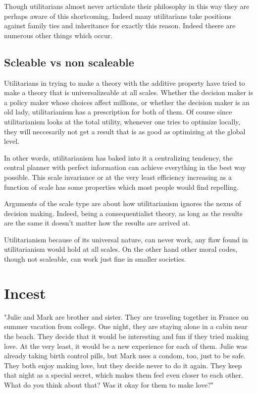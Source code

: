 Though utilitarians almost never articulate their philosophy in this way they are perhaps aware of this shortcoming. Indeed many utilitarians take positions against family ties and inheritance for exactly this reason. Indeed theere are numerous other things which occur. 
 


\subsection{Scleable vs non scaleable}

Utilitarians in trying to make a theory with the additive property have tried to make a theory that is universalizeable at all scales. Whether the decision maker is a policy maker whose choices affect millions, or whether the decision maker is an old lady, utilitarianism has a prescription for both of them. Of course since utilitarianism looks at the total utility, whenever one tries to optimize locally, they will neccesarily not get a result that is as good as optimizing at the global level. 

In other words, utilitarianism has baked into it a centralizing tendency, the central planner with perfect information can achieve everything in the best way possible. This scale invariance or at the very least efficiency increasing as a function of scale has some properties which most people would find repelling. 

Arguments of the scale type are about how utilitarianism ignores the nexus of decision making. Indeed, being a consequentialist theory, as long as the results are the same it doesn't matter how the results are arrived at. 

Utilitarianism because of its universal nature, can never work, any flaw found in utilitarianism would hold at all scales. 
On the other hand other moral codes, though not scaleable, can work just fine in smaller societies. 

\section{Incest}

"Julie and Mark are brother and sister. They are traveling together in France on summer vacation from college. One night, they are staying alone in a cabin near the beach. They decide that it would be interesting and fun if they tried making love. At the very least, it would be a new experience for each of them. Julie was already taking birth control pills, but Mark uses a condom, too, just to be safe. They both enjoy making love, but they decide never to do it again. They keep that night as a special secret, which makes them feel even closer to each other. What do you think about that? Was it okay for them to make love?"


